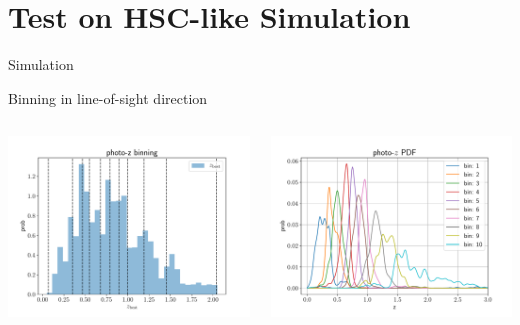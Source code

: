 \documentclass[10pt]{beamer}
\begin{document}
\section{Test on HSC-like Simulation}
\begin{frame}{Simulation}
\begin{alertblock}{Binning in line-of-sight direction}

\end{alertblock}
\begin{columns}
\begin{column}{0.5\textwidth}
\includegraphics[height=.8\textwidth]{../paper_ms_method_HSCY1/photo-z_binning.pdf}
\end{column}
\begin{column}{0.5\textwidth}
\includegraphics[height=.8\textwidth]{../paper_ms_method_HSCY1/mlz-poz.pdf}
\end{column}
\end{columns}
\end{frame}
\end{document}
